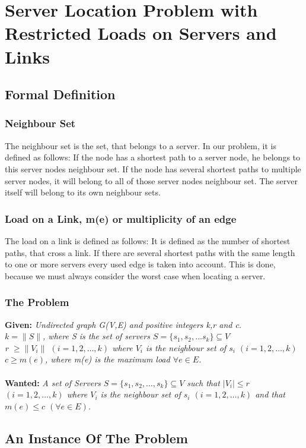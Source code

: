 \documentclass [12pt]{article}
\begin{document}
\section{Server Location Problem with Restricted Loads on Servers and Links}
\subsection{Formal Definition}
\subsubsection{Neighbour Set}
The neighbour set is the set, that belongs to a server. In our problem, it is
defined as follows: If the node has a shortest path to a server node, he 
belongs to this server nodes neighbour set. If the node has several shortest
paths to multiple server nodes, it will belong to all of those server nodes neighbour
set. The server itself will belong to its own neighbour sets.
\subsubsection{Load on a Link, m(e) or multiplicity of an edge}
The load on a link is defined as follows: 
It is defined as the number of shortest paths, that cross a link. If there
are several shortest paths with the same length to one or more servers every
used edge is taken into account. This is done, because we must always consider
the worst case when locating a server.
\subsubsection{The Problem}
\textbf{Given:}
{\itshape Undirected graph G(V,E) and  positive integers k,r and c. \\
    $k = \|S\|$, where S is the set of servers $S = \{s_1,s_2,\dots s_k\} \subseteq V$\\
    r $\geq  \|V_i\|$ $(i=1,2,\dots,k)$ where $V_i$ is the neighbour set of $s_i$ $(i=1,2,\dots,k)$\\
$c \geq m(e)$, where m(e) is the maximum load $\forall e \in E$.} \\
\\
\textbf{Wanted:} 
{\itshape A set of Servers $S = \{s_1, s_2,\dots, s_k \} \subseteq V$ such that $|V_i|\leq r$
    $(i = 1,2, \dots,k)$ where $V_i$ is the neighbour set of $s_i$  $(i = 1,2,\dots,k)$ and that
$m(e) \leq c$ $(\forall e \in E)$.}

\subsection{An Instance Of The Problem}
\indent
\indent
\indent
\end{document}
